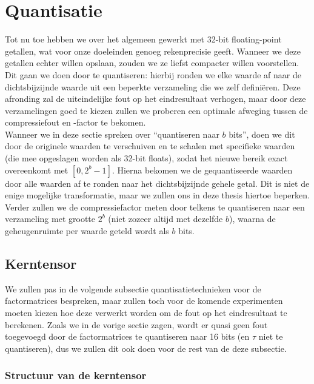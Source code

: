 \section{Quantisatie}
\label{sec:quantisatie}

Tot nu toe hebben we over het algemeen gewerkt met 32-bit floating-point getallen, wat voor onze doeleinden genoeg rekenprecisie geeft. Wanneer we deze getallen echter willen opslaan, zouden we ze liefst compacter willen voorstellen. Dit gaan we doen door te quantiseren: hierbij ronden we elke waarde af naar de dichtsbijzijnde waarde uit een beperkte verzameling die we zelf defini\"eren. Deze afronding zal de uiteindelijke fout op het eindresultaat verhogen, maar door deze verzamelingen goed te kiezen zullen we proberen een optimale afweging tussen de compressiefout en -factor te bekomen.\\

Wanneer we in deze sectie spreken over ``quantiseren naar $b$ bits'', doen we dit door de originele waarden te verschuiven en te schalen met specifieke waarden (die mee opgeslagen worden als 32-bit floats), zodat het nieuwe bereik exact overeenkomt met $[0, 2^b - 1]$. Hierna bekomen we de gequantiseerde waarden door alle waarden af te ronden naar het dichtsbijzijnde gehele getal. Dit is niet de enige mogelijke transformatie, maar we zullen ons in deze thesis hiertoe beperken. Verder zullen we de compressiefactor meten door telkens te quantiseren naar een verzameling met grootte $2^b$ (niet zozeer altijd met dezelfde $b$), waarna de geheugenruimte per waarde geteld wordt als $b$ bits. 

\subsection{Kerntensor}

We zullen pas in de volgende subsectie quantisatietechnieken voor de factormatrices bespreken, maar zullen toch voor de komende experimenten moeten kiezen hoe deze verwerkt worden om de fout op het eindresultaat te berekenen. Zoals we in de vorige sectie zagen, wordt er quasi geen fout toegevoegd door de factormatrices te quantiseren naar 16 bits (en $\tau$ niet te quantiseren), dus we zullen dit ook doen voor de rest van de deze subsectie.

\subsubsection{Structuur van de kerntensor}

